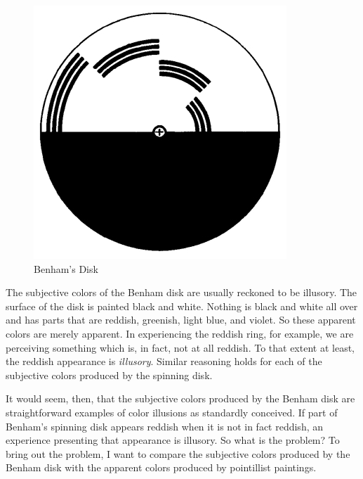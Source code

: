 \documentclass[12pt]{article}
\begin{document}
\begin{figure}[htbp]
	\centering
		\includegraphics[scale=.5]{graphics/benhams_disk.jpg}
	\caption{Benham's Disk}
	\label{fig:benham}
\end{figure}

The subjective colors of the Benham disk are usually reckoned to be illusory. The surface of the disk is painted black and white. Nothing is black and white all over and has parts that are reddish, greenish, light blue, and violet. So these apparent colors are merely apparent. In experiencing the reddish ring, for example, we are perceiving something which is, in fact, not at all reddish. To that extent at least, the reddish appearance is \emph{illusory}. Similar reasoning holds for each of the subjective colors produced by the spinning disk.

It would seem, then, that the subjective colors produced by the Benham disk are straightforward examples of color illusions as standardly conceived. If part of Benham's spinning disk appears reddish when it is not in fact reddish, an experience presenting that appearance is illusory. So what is the problem? To bring out the problem, I want to compare the subjective colors produced by the Benham disk with the apparent colors produced by pointillist paintings.
\end{document}
